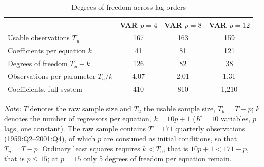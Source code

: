 \begin{table}[htpb]
    \centering
    \caption{Degrees of freedom across lag orders}
    \label{tab:df_budget}
    \begin{tabular}{lccc}
        \toprule
         & \textbf{VAR $p=4$} & \textbf{VAR $p=8$} & \textbf{VAR $p=12$} \\
        \midrule
        Usable observations $T_u$ & 167 & 163 & 159 \\
        Coefficients per equation $k$ & 41 & 81 & 121 \\
        Degrees of freedom $T_u-k$ & 126 & 82 & 38 \\
        Observations per parameter $T_u/k$ & 4.07 & 2.01 & 1.31 \\
        Coefficients, full system & 410 & 810 & 1{,}210 \\
        \bottomrule
    \end{tabular}

    \vspace{0.15cm}
    \raggedright
    \footnotesize{\textit{Note:} $T$ denotes the raw sample size and $T_u$ the usable sample size, $T_u = T-p$; $k$ denotes the number of regressors per equation, $k = 10p+1$ ($K=10$ variables, $p$ lags, one constant). The raw sample contains $T=171$ quarterly observations (1959:Q2--2001:Q4), of which $p$ are consumed as initial conditions, so that $T_u = T-p$. Ordinary least squares requires $k < T_u$, that is $10p+1 < 171-p$, that is $p \leq 15$; at $p=15$ only 5 degrees of freedom per equation remain.}
\end{table}
